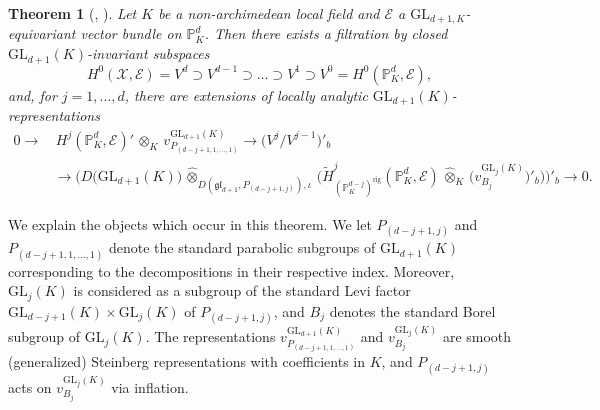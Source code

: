 \documentclass[a4paper, reqno, 10pt]{amsart}
\newtheorem{theoremalphabetical}{Theorem}[section]
\theoremstyle{definition}
\numberwithin{equation}{section}
\newcommand{\botimes}[1]{{\,\otimes_{#1}\,}}
\newcommand{\cotimes}[1]{{\,\widehat{\otimes}_{#1}\,}}
\newcommand{\GL}{{\mathrm{GL}}}
\newcommand{\lra}{\longrightarrow}
\newcommand{\rig}{{\mathrm{rig}}}
\newcommand{\BP}{{\mathbb {P}}}
\newcommand{\CE}{{\mathcal {E}}}
\newcommand{\CX}{{\mathcal {X}}}
\begin{document}
\begin{theoremalphabetical}[, ]\label{Thm 0 - Main Theorem}
	Let $K$ be a non-archimedean local field and $\CE$ a $\GL_{d+1,K}$-equivariant vector bundle on $\BP_K^d$.
	Then there exists a filtration by closed $\GL_{d+1}(K)$-invariant subspaces
	\begin{equation*}
		H^0 (\CX,\CE)  = V^{d} \supset V^{d-1} \supset \ldots \supset V^1 \supset V^0 = H^0(\BP_K^d, \CE),
	\end{equation*}
	and, for $j = 1,\ldots, d$, there are extensions of locally analytic $\GL_{d+1}(K)$-representations
	\begin{equation*}
		\begin{aligned}
			0 \lra &{\hspace{2pt}} H^j (\BP_K^d, \CE)' \botimes{K} v^{\GL_{d+1}(K)}_{P_{(d-j+1,1,\ldots,1)}}  \lra \big( V^j/V^{j-1} \big)'_b\\
			&\lra  \bigg( D\big(\GL_{d+1}(K) \big) \cotimes{D(\mathfrak{gl}_{d+1},P_{(d-j+1,j)}), \iota} \Big( \widetilde{H}^{j}_{(\BP_K^{d-j})^\rig} (\BP_K^d, \CE) \cotimes{K} \big( v^{\GL_{j}(K)}_{B_{j}} \big)'_b \Big) \bigg)'_b \lra 0 .
		\end{aligned}
	\end{equation*}
\end{theoremalphabetical}


We explain the objects which occur in this theorem.
We let $P_{(d-j+1,j)}$ and $P_{(d-j+1,1,\ldots,1)}$ denote the standard parabolic subgroups of $\GL_{d+1}(K)$ corresponding to the decompositions in their respective index.
Moreover, $\GL_j(K)$ is considered as a subgroup of the standard Levi factor $\GL_{d-j+1}(K) \times \GL_j(K)$ of $P_{(d-j+1,j)}$, and $B_j$ denotes the standard Borel subgroup of $\GL_j(K)$.
The representations $v^{\GL_{d+1}(K)}_{P_{(d-j+1,1,\ldots,1)}}$ and $v^{\GL_{j}(K)}_{B_{j}}$ are smooth (generalized) Steinberg representations with coefficients in $K$, and $P_{(d-j+1,j)}$ acts on $v^{\GL_{j}(K)}_{B_{j}}$ via inflation.
\end{document}
